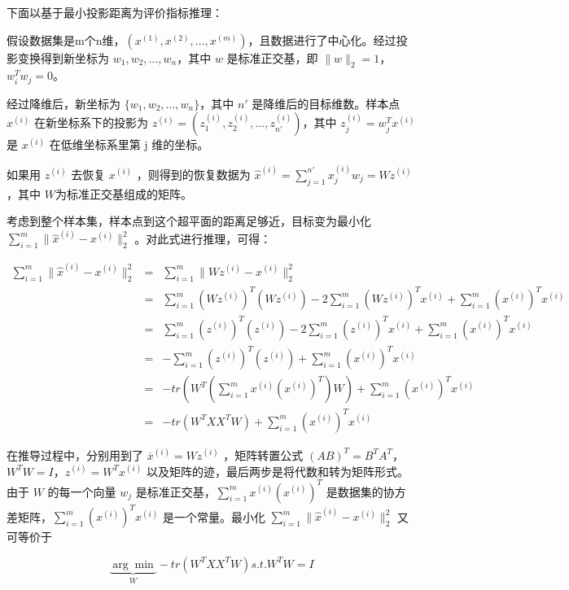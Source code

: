 下面以基于最小投影距离为评价指标推理：

假设数据集是m个n维，$(x^{(1)}, x^{(2)},...,x^{(m)})$，且数据进行了中心化。经过投影变换得到新坐标为 ${w_1,w_2,...,w_n}$，其中 $w$ 是标准正交基，即 $\| w \|_2 = 1$，$w^T_iw_j = 0$。


经过降维后，新坐标为 $\{ w_1,w_2,...,w_n \}$，其中 $n'$ 是降维后的目标维数。样本点 $x^{(i)}$ 在新坐标系下的投影为 $z^{(i)} = \left(z^{(i)}_1, z^{(i)}_2, ..., z^{(i)}_{n'}   \right)$，其中 $z^{(i)}_j = w^T_j x^{(i)}$ 是 $x^{(i)} $ 在低维坐标系里第 j 维的坐标。

如果用 $z^{(i)} $ 去恢复 $x^{(i)} $ ，则得到的恢复数据为 $\widehat{x}^{(i)} = \sum^{n'}_{j=1} x^{(i)}_j w_j = Wz^{(i)}$，其中 $W$为标准正交基组成的矩阵。

考虑到整个样本集，样本点到这个超平面的距离足够近，目标变为最小化 $\sum^m_{i=1} \| \hat{x}^{(i)} - x^{(i)} \|^2_2$ 。对此式进行推理，可得：

\begin{eqnarray*}
	\sum^m_{i=1} \| \hat{x}^{(i)} - x^{(i)} \|^2_2 &=& \sum^m_{i=1} \| Wz^{(i)} - x^{(i)} \|^2_2 \\
	&=& \sum^m_{i=1} \left( Wz^{(i)} \right)^T \left( Wz^{(i)} \right) - 2\sum^m_{i=1} \left( Wz^{(i)} \right)^T x^{(i)} + \sum^m_{i=1} \left( x^{(i)} \right)^T x^{(i)} \\
	&=& \sum^m_{i=1} \left( z^{(i)} \right)^T \left( z^{(i)} \right) - 2\sum^m_{i=1} \left( z^{(i)} \right)^T x^{(i)} + \sum^m_{i=1} \left( x^{(i)} \right)^T x^{(i)} \\
	&=& - \sum^m_{i=1} \left( z^{(i)} \right)^T \left( z^{(i)} \right) + \sum^m_{i=1} \left( x^{(i)} \right)^T x^{(i)} \\
	&=& -tr \left( W^T \left( \sum^m_{i=1} x^{(i)} \left( x^{(i)} \right)^T \right)W \right) + \sum^m_{i=1} \left( x^{(i)} \right)^T x^{(i)} \\
	&=& -tr \left( W^TXX^TW \right) + \sum^m_{i=1} \left( x^{(i)} \right)^T x^{(i)}
\end{eqnarray*}

在推导过程中，分别用到了 $\overline{x}^{(i)} = Wz^{(i)}$ ，矩阵转置公式 $(AB)^T = B^TA^T$，$W^TW = I$，$z^{(i)} = W^Tx^{(i)}$ 以及矩阵的迹，最后两步是将代数和转为矩阵形式。由于 $W$ 的每一个向量 $w_j$ 是标准正交基，$\sum^m_{i=1} x^{(i)} \left(  x^{(i)} \right)^T$ 是数据集的协方差矩阵，$\sum^m_{i=1} \left(  x^{(i)} \right)^T x^{(i)} $ 是一个常量。最小化 $\sum^m_{i=1} \| \hat{x}^{(i)} - x^{(i)} \|^2_2$ 又可等价于

$$
\underbrace{\arg \min}_W - tr \left( W^TXX^TW \right) s.t.W^TW = I
$$

